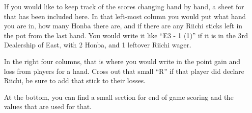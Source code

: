 If you would like to keep track of the scores changing hand by hand, a sheet for that has been included here. In that left-most column you would put what hand you are in, how many Honba there are, and if there are any Riichi sticks left in the pot from the last hand. You would write it like ``E3 - 1 (1)'' if it is in the 3rd Dealership of East, with 2 Honba, and 1 leftover Riichi wager.

In the right four columns, that is where you would write in the point gain and loss from players for a hand. Cross out that small ``R'' if that player did declare Riichi, be sure to add that stick to their losses.



At the bottom, you can find a small section for end of game scoring and the values that are used for that.




